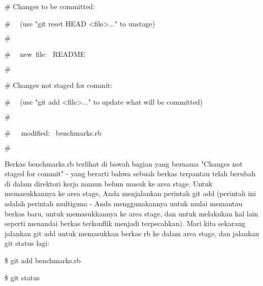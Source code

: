 {\fontsize{14pt}{14pt}\selectfont  $  \#  $ Changes to be committed: \\} \par
\noindent 
{\fontsize{14pt}{14pt}\selectfont  $  \#  $~~ (use "git reset HEAD <file>..." to unstage) \\} \par
\noindent 
{\fontsize{14pt}{14pt}\selectfont  $  \#  $ \\} \par
\noindent 
{\fontsize{14pt}{14pt}\selectfont  $  \#  $~~ new~file:~  README \\} \par
\noindent 
{\fontsize{14pt}{14pt}\selectfont  $  \#  $ \\} \par
\noindent 
{\fontsize{14pt}{14pt}\selectfont  $  \#  $ Changes not staged for commit: \\} \par
\noindent 
{\fontsize{14pt}{14pt}\selectfont  $  \#  $~~ (use "git add <file>..." to update what will be committed) \\} \par
\noindent 
{\fontsize{14pt}{14pt}\selectfont  $  \#  $ \\} \par
\noindent 
{\fontsize{14pt}{14pt}\selectfont  $  \#  $~~~modified:~  benchmarks.rb \\} \par
\noindent 
{\fontsize{14pt}{14pt}\selectfont  $  \#  $ \\} \par
\noindent 
{\fontsize{14pt}{14pt}\selectfont Berkas benchmarks.rb terlihat di bawah bagian yang bernama "Changes not staged for commit" - yang berarti bahwa sebuah berkas terpantau telah berubah di dalam direktori kerja namun belum masuk ke area stage. Untuk memasukkannya ke area stage, Anda menjalankan perintah $  $git add $  $(perintah ini adalah perintah multiguna - Anda menggunakannya untuk mulai memantau berkas baru, untuk memasukkannya ke area stage, dan untuk melakukan hal lain seperti menandai berkas terkonflik menjadi terpecahkan). Mari kita sekarang jalankan $  $git add $  $untuk memasukkan berkas rb ke dalam area stage, dan jalankan $  $git status $  $lagi: \\} \par
\noindent 
{\fontsize{14pt}{14pt}\selectfont  $  \$  $ git add benchmarks.rb \\} \par
\noindent 
{\fontsize{14pt}{14pt}\selectfont  $  \$  $ git status \\} \par
